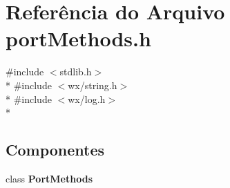 \section{Referência do Arquivo port\+Methods.\+h}
\label{port_methods_8h}
{\ttfamily \#include $<$stdlib.\+h$>$}\\*
{\ttfamily \#include $<$wx/string.\+h$>$}\\*
{\ttfamily \#include $<$wx/log.\+h$>$}\\*
\subsection*{Componentes}
\begin{DoxyCompactItemize}
\item 
class {\bf Port\+Methods}
\end{DoxyCompactItemize}
